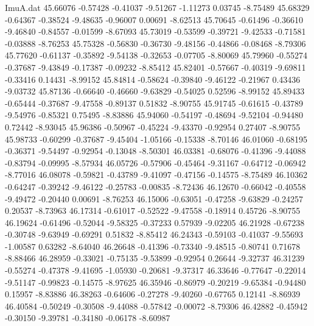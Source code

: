 \begin{filecontents}{ImuA.dat}
  45.66076   -0.57428   -0.41037   -9.51267   -1.11273    0.03745   -8.75489
  45.68329   -0.64367   -0.38524   -9.48635   -0.96007    0.00691   -8.62513
  45.70645   -0.61496   -0.36610   -9.46840   -0.84557   -0.01599   -8.67093
  45.73019   -0.53599   -0.39721   -9.42533   -0.71581   -0.03888   -8.76253
  45.75328   -0.56830   -0.36730   -9.48156   -0.44866   -0.08468   -8.79306
  45.77620   -0.61137   -0.35892   -9.54138   -0.32653   -0.07705   -8.80069
  45.79960   -0.55274   -0.37687   -9.43849   -0.17387   -0.09232   -8.85412
  45.82401   -0.57667   -0.40319   -9.69811   -0.33416    0.14431   -8.99152
  45.84814   -0.58624   -0.39840   -9.46122   -0.21967    0.43436   -9.03732
  45.87136   -0.66640   -0.46660   -9.63829   -0.54025    0.52596   -8.99152
  45.89433   -0.65444   -0.37687   -9.47558   -0.89137    0.51832   -8.90755
  45.91745   -0.61615   -0.43789   -9.54976   -0.85321    0.75495   -8.83886
  45.94060   -0.54197   -0.48694   -9.52104   -0.94480    0.72442   -8.93045
  45.96386   -0.50967   -0.45224   -9.43370   -0.92954    0.27407   -8.90755
  45.98733   -0.60299   -0.37687   -9.45404   -1.05166   -0.15338   -8.70146
  46.01060   -0.68195   -0.36371   -9.54497   -0.92954   -0.13048   -8.50301
  46.03381   -0.68076   -0.41396   -9.44088   -0.83794   -0.09995   -8.57934
  46.05726   -0.57906   -0.45464   -9.31167   -0.64712   -0.06942   -8.77016
  46.08078   -0.59821   -0.43789   -9.41097   -0.47156   -0.14575   -8.75489
  46.10362   -0.64247   -0.39242   -9.46122   -0.25783   -0.00835   -8.72436
  46.12670   -0.66042   -0.40558   -9.49472   -0.20440    0.00691   -8.76253
  46.15006   -0.63051   -0.47258   -9.63829   -0.24257    0.20537   -8.73963
  46.17314   -0.61017   -0.52522   -9.47558   -0.18914    0.45726   -8.90755
  46.19624   -0.61496   -0.52044   -9.58325   -0.37233    0.57939   -9.02205
  46.21928   -0.67238   -0.30748   -9.63949   -0.69291    0.51832   -8.85412
  46.24343   -0.59103   -0.41037   -9.55693   -1.00587    0.63282   -8.64040
  46.26648   -0.41396   -0.73340   -9.48515   -0.80741    0.71678   -8.88466
  46.28959   -0.33021   -0.75135   -9.53899   -0.92954    0.26644   -9.32737
  46.31239   -0.55274   -0.47378   -9.41695   -1.05930   -0.20681   -9.37317
  46.33646   -0.77647   -0.22014   -9.51147   -0.99823   -0.14575   -8.97625
  46.35946   -0.86979   -0.20219   -9.65384   -0.94480    0.15957   -8.83886
  46.38263   -0.64606   -0.27278   -9.40260   -0.67765    0.12141   -8.86939
  46.40584   -0.50249   -0.30508   -9.44088   -0.57842   -0.00072   -8.79306
  46.42882   -0.45942   -0.30150   -9.39781   -0.34180   -0.06178   -8.60987

\end{filecontents}

